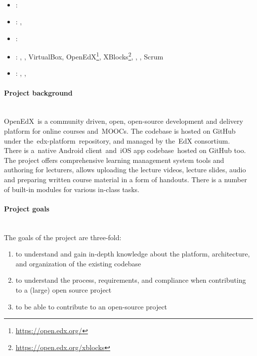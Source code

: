 \label{sec:section5}

\subsection[Global Software Development]{}
\label{sec:glob_soft_dev}
\begin{itemize} 
	\item {}: 
	\item {}: , 
	\item {}: 
	\item {}: , , VirtualBox, OpenEdX\footnote{\url{https://open.edx.org/}}, XBlocks\footnote{\url{https://open.edx.org/xblocks}}, 
	, , Scrum
	\item {}: , , 
\end{itemize} 
\paragraph{Project background} ~\\
OpenEdX is a community driven, open, open-source development and delivery platform for online courses and MOOCs. 
The codebase is hosted on GitHub under the edx-platform repository, and managed by the EdX consortium.  
There is a native Android client and iOS app codebase hosted on GitHub too. 
The project offers comprehensive learning management system tools and authoring for lecturers, allows uploading the lecture videos, lecture slides, 
audio and preparing written course material in a form of handouts. 
There is a number of built-in modules for various in-class tasks.

\paragraph{Project goals} ~\\
The goals of the project are three-fold:
\begin{enumerate}
	\item to understand and gain in-depth knowledge about the platform, architecture, and organization of the existing codebase
	\item to understand the process, requirements, and compliance when contributing to a (large) open source project
	\item to be able to contribute to an open-source project
\end{enumerate}

